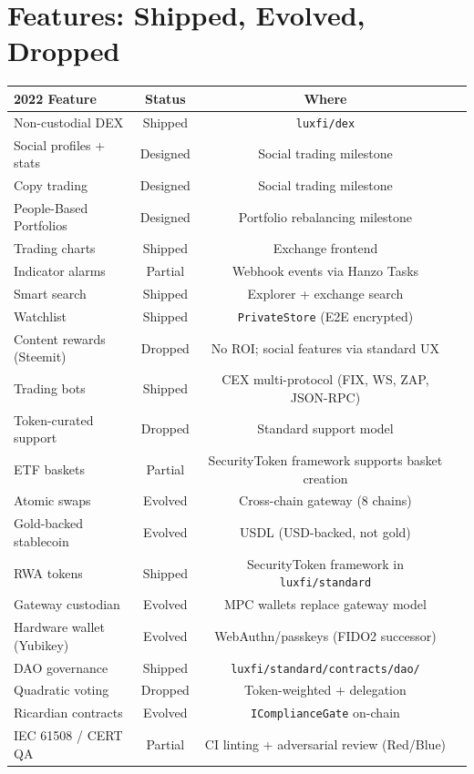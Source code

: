 \section{Features: Shipped, Evolved, Dropped}


\begin{center}
\small
\begin{tabular}{p{4.5cm}ccp{5cm}}
\toprule
\textbf{2022 Feature} & \textbf{Status} & \textbf{Where} \\
\midrule
Non-custodial DEX         & Shipped  & \texttt{luxfi/dex} \\
Social profiles + stats   & Designed & Social trading milestone \\
Copy trading              & Designed & Social trading milestone \\
People-Based Portfolios   & Designed & Portfolio rebalancing milestone \\
Trading charts            & Shipped  & Exchange frontend \\
Indicator alarms          & Partial  & Webhook events via Hanzo Tasks \\
Smart search              & Shipped  & Explorer + exchange search \\
Watchlist                 & Shipped  & \texttt{PrivateStore} (E2E encrypted) \\
Content rewards (Steemit) & Dropped  & No ROI; social features via standard UX \\
Trading bots              & Shipped  & CEX multi-protocol (FIX, WS, ZAP, JSON-RPC) \\
Token-curated support     & Dropped  & Standard support model \\
ETF baskets               & Partial  & SecurityToken framework supports basket creation \\
Atomic swaps              & Evolved  & Cross-chain gateway (8 chains) \\
Gold-backed stablecoin    & Evolved  & USDL (USD-backed, not gold) \\
RWA tokens                & Shipped  & SecurityToken framework in \texttt{luxfi/standard} \\
Gateway custodian         & Evolved  & MPC wallets replace gateway model \\
Hardware wallet (Yubikey)  & Evolved  & WebAuthn/passkeys (FIDO2 successor) \\
DAO governance            & Shipped  & \texttt{luxfi/standard/contracts/dao/} \\
Quadratic voting          & Dropped  & Token-weighted + delegation \\
Ricardian contracts       & Evolved  & \texttt{IComplianceGate} on-chain \\
IEC 61508 / CERT QA       & Partial  & CI linting + adversarial review (Red/Blue) \\
\bottomrule
\end{tabular}
\end{center}

